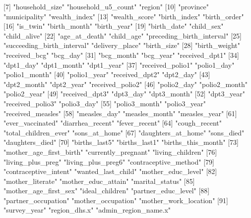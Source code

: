   [7] "household_size"            "household_u5_count"        "region"                   
 [10] "province"                  "municipality"              "wealth_index"             
 [13] "wealth_score"              "birth_index"               "birth_order"              
 [16] "is_twin"                   "birth_month"               "birth_year"               
 [19] "birth_date"                "child_sex"                 "child_alive"              
 [22] "age_at_death"              "child_age"                 "preceding_birth_interval" 
 [25] "succeeding_birth_interval" "delivery_place"            "birth_size"               
 [28] "birth_weight"              "received_bcg"              "bcg_day"                  
 [31] "bcg_month"                 "bcg_year"                  "received_dpt1"            
 [34] "dpt1_day"                  "dpt1_month"                "dpt1_year"                
 [37] "received_polio1"           "polio1_day"                "polio1_month"             
 [40] "polio1_year"               "received_dpt2"             "dpt2_day"                 
 [43] "dpt2_month"                "dpt2_year"                 "received_polio2"          
 [46] "polio2_day"                "polio2_month"              "polio2_year"              
 [49] "received_dpt3"             "dpt3_day"                  "dpt3_month"               
 [52] "dpt3_year"                 "received_polio3"           "polio3_day"               
 [55] "polio3_month"              "polio3_year"               "received_measles"         
 [58] "measles_day"               "measles_month"             "measles_year"             
 [61] "ever_vaccinated"           "diarrhea_recent"           "fever_recent"             
 [64] "cough_recent"              "total_children_ever"       "sons_at_home"             
 [67] "daughters_at_home"         "sons_died"                 "daughters_died"           
 [70] "births_last5"              "births_last1"              "births_this_month"        
 [73] "mother_age_first_birth"    "currently_pregnant"        "living_children"          
 [76] "living_plus_preg"          "living_plus_preg6"         "contraceptive_method"     
 [79] "contraceptive_intent"      "wanted_last_child"         "mother_educ_level"        
 [82] "mother_literate"           "mother_educ_attain"        "marital_status"           
 [85] "mother_age_first_sex"      "ideal_children"            "partner_educ_level"       
 [88] "partner_occupation"        "mother_occupation"         "mother_work_location"     
 [91] "survey_year"               "region_dhs.x"              "admin_region_name.x"      
